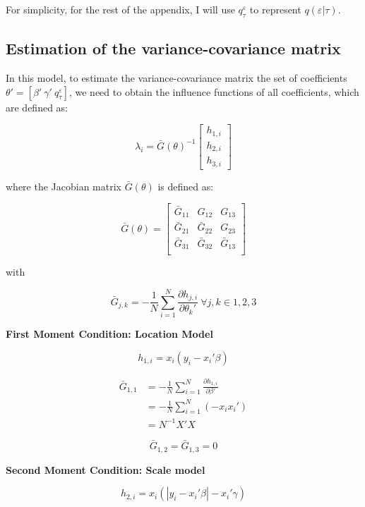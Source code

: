 \documentclass[
  authoryear,
  review,
  1p]{elsarticle}
\begin{document}
For simplicity, for the rest of the appendix, I will use
\(q^\varepsilon_\tau\) to represent \(q(\varepsilon |\tau)\).

\hypertarget{estimation-of-the-variance-covariance-matrix}{%
\subsection{Estimation of the variance-covariance
matrix}\label{estimation-of-the-variance-covariance-matrix}}

In this model, to estimate the variance-covariance matrix the set of
coefficients \(\theta'=[\beta' \ \gamma' \ q^\varepsilon_\tau]\), we
need to obtain the influence functions of all coefficients, which are
defined as:

\[\lambda_i = \bar G(\theta)^{-1}
\begin{bmatrix}
h_{1,i} \\
h_{2,i} \\
h_{3,i}
\end{bmatrix}
\]

where the Jacobian matrix \(\bar G(\theta)\) is defined as:

\[\bar G(\theta) = \begin{bmatrix}
\bar G_{11} & G_{12} & G_{13} \\
\bar G_{21} & \bar G_{22} & G_{23} \\
\bar G_{31} & \bar G_{32} & \bar G_{13} \\
\end{bmatrix}
\]

with

\[\bar G_{j,k} = - \frac 1 N \sum_{i=1}^N \frac{\partial h_{j,i}}{\partial \theta_k'} \ \forall j,k \in 1,2,3
\]

\textbf{First Moment Condition: Location Model}

\[h_{1,i}=x_i(y_i-x_i'\beta)\]

\[\begin{aligned}
\bar G_{1,1} &=- \frac{1}{N} \sum_{i=1}^N \frac{\partial h_{1,i}}{\partial \beta'} \\
             &=- \frac{1}{N} \sum_{i=1}^N (-x_i x_i') \\
             &= N^{-1} X'X
\end{aligned}
\]

\[
\bar G_{1,2} = \bar G_{1,3} = 0
\]

\textbf{Second Moment Condition: Scale model}

\[h_{2,i}=x_i(|y_i-x_i'\beta|-x_i'\gamma)\]
\end{document}
